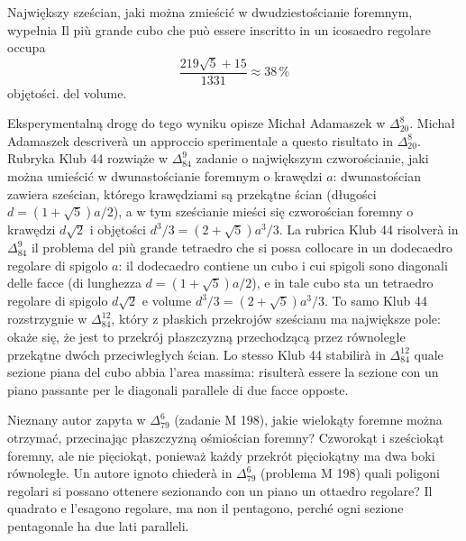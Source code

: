 \begin{proposition}
    Największy sześcian, jaki można zmieścić w dwudziestościanie foremnym, wypełnia %
    Il più grande cubo che può essere inscritto in un icosaedro regolare occupa %
    \begin{equation}
        \frac{219 \sqrt 5 + 15}{1331} \approx 38\,\%
    \end{equation}
    objętości. %
    del volume. %
\end{proposition}

Eksperymentalną drogę do tego wyniku opisze Michał Adamaszek w $\Delta_{20}^8$. %
Michał Adamaszek descriverà un approccio sperimentale a questo risultato in $\Delta_{20}^8$. %
Rubryka Klub 44 rozwiąże w $\Delta_{84}^{9}$ zadanie o największym czworościanie, jaki można umieścić w dwunastościanie foremnym o krawędzi $a$: dwunastościan zawiera sześcian, którego krawędziami są przekątne ścian (długości $d = (1 + \sqrt 5) a / 2$), a w tym sześcianie mieści się czworościan foremny o krawędzi $d \sqrt 2$ i objętości $d^3 / 3 = (2 + \sqrt 5) a^3 / 3$. %
La rubrica Klub 44 risolverà in $\Delta_{84}^{9}$ il problema del più grande tetraedro che si possa collocare in un dodecaedro regolare di spigolo $a$: il dodecaedro contiene un cubo i cui spigoli sono diagonali delle facce (di lunghezza $d = (1 + \sqrt 5) a / 2$), e in tale cubo sta un tetraedro regolare di spigolo $d \sqrt 2$ e volume $d^3 / 3 = (2 + \sqrt 5) a^3 / 3$. %
To samo Klub 44 rozstrzygnie w $\Delta_{84}^{12}$, który z płaskich przekrojów sześcianu ma największe pole: okaże się, że jest to przekrój płaszczyzną przechodzącą przez równoległe przekątne dwóch przeciwległych ścian. %
Lo stesso Klub 44 stabilirà in $\Delta_{84}^{12}$ quale sezione piana del cubo abbia l'area massima: risulterà essere la sezione con un piano passante per le diagonali parallele di due facce opposte. %

Nieznany autor zapyta w $\Delta_{79}^{6}$ (zadanie M 198), jakie wielokąty foremne można otrzymać, przecinając płaszczyzną ośmiościan foremny? %
Czworokąt i sześciokąt foremny, ale nie pięciokąt, ponieważ każdy przekrót pięciokątny ma dwa boki równoległe. %
Un autore ignoto chiederà in $\Delta_{79}^{6}$ (problema M 198) quali poligoni regolari si possano ottenere sezionando con un piano un ottaedro regolare? %
Il quadrato e l'esagono regolare, ma non il pentagono, perché ogni sezione pentagonale ha due lati paralleli. %


%